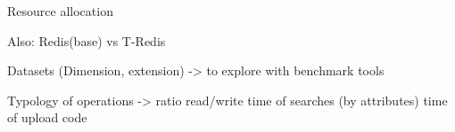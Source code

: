 Resource allocation


Also: Redis(base) vs T-Redis
	  
	  Datasets (Dimension, extension) -> to explore with benchmark tools
	  
	  Typology of operations -> ratio read/write
	  							time of searches (by attributes)
	  							time of upload code


% 
% 
% 
% 



